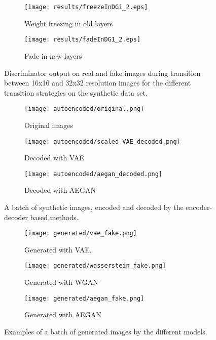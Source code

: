 \begin{figure}[t]
    \centering
    \begin{subfigure}[b]{0.49\textwidth}
        \texttt{[image: results/freezeInDG1\_2.eps]}
        \caption{Weight freezing in old layers}
        \label{fig:freezeInDG1}
    \end{subfigure}
    \begin{subfigure}[b]{0.49\textwidth}
        \texttt{[image: results/fadeInDG1\_2.eps]}
        \caption{Fade in new layers}
        \label{fig:freezeInDG2}
    \end{subfigure}
    \caption{Discriminator output on real and fake images during transition between 16x16 and 32x32 resolution images for the different transition strategies on the synthetic data set.}
    \label{fig:fadeVsFreeze}
\end{figure}

\begin{figure}[t]
    \centering
    \begin{subfigure}[b]{\textwidth}
        \texttt{[image: autoencoded/original.png]}
        \caption{Original images}
        \label{fig:stuff}
    \end{subfigure}
    \begin{subfigure}[b]{\textwidth}
        \texttt{[image: autoencoded/scaled\_VAE\_decoded.png]}
        \caption{Decoded with VAE}
        \label{fig:stuff}
    \end{subfigure}
    \begin{subfigure}[b]{\textwidth}
        \texttt{[image: autoencoded/aegan\_decoded.png]}
        \caption{Decoded with AEGAN}
        \label{fig:stuff}
    \end{subfigure}
    \caption{A batch of synthetic images, encoded and decoded by the encoder-decoder based methods.}
    \label{fig:autoencoders}
\end{figure}

\begin{figure}[t]
    \centering
    \begin{subfigure}[b]{\textwidth}
        \texttt{[image: generated/vae\_fake.png]}
        \caption{Generated with VAE.}
        \label{fig:stuff}
    \end{subfigure}
    \begin{subfigure}[b]{\textwidth}
        \texttt{[image: generated/wasserstein\_fake.png]}
        \caption{Generated with WGAN}
        \label{fig:stuff}
    \end{subfigure}
    \begin{subfigure}[b]{\textwidth}
        \texttt{[image: generated/aegan\_fake.png]}
        \caption{Generated with AEGAN}
        \label{fig:stuff}
    \end{subfigure}
    \caption{Examples of a batch of generated images by the different models.}
    \label{fig:gans}
\end{figure}

